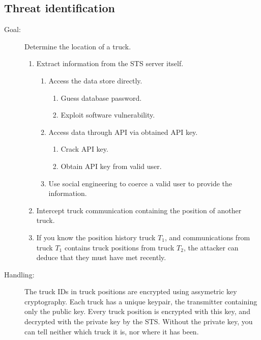 \documentclass[a4paper,11pt]{report}
\begin{document}
\subsection{Threat identification}
\label{sec:threats}

\renewcommand{\labelenumi}{\textbf{\arabic{enumi}.}}
\renewcommand{\labelenumii}{\textbf{\labelenumi\arabic{enumii}.}}
\renewcommand{\labelenumiii}{\textbf{\labelenumii\arabic{enumiii}.}}

\begin{description}
\item[Goal: ] Determine the location of a truck.
  \begin{enumerate}
    \item Extract information from the STS server itself.
      \begin{enumerate}
        \item Access the data store directly.
          \begin{enumerate}
          \item Guess database password.
          \item Exploit software vulnerability.
          \end{enumerate}
        \item Access data through API via obtained API key.
          \begin{enumerate}
            \item Crack API key.
            \item Obtain API key from valid user.
          \end{enumerate}
        \item Use social engineering to coerce a valid user to provide
          the information.
      \end{enumerate}
    \item Intercept truck communication containing the position of
      another truck.
    \item If you know the position history truck $T_{1}$, and
      communications from truck $T_{1}$ contains truck positions from
      truck $T_{2}$, the attacker can deduce that they must have met
      recently.
  \end{enumerate}
\item[Handling: ] The truck IDs in truck positions are encrypted using
  assymetric key cryptography.  Each truck has a unique keypair, the
  transmitter containing only the public key.  Every truck position is
  encrypted with this key, and decrypted with the private key by the
  STS.  Without the private key, you can tell neither which truck it
  is, nor where it has been.


\end{description}
\end{document}
